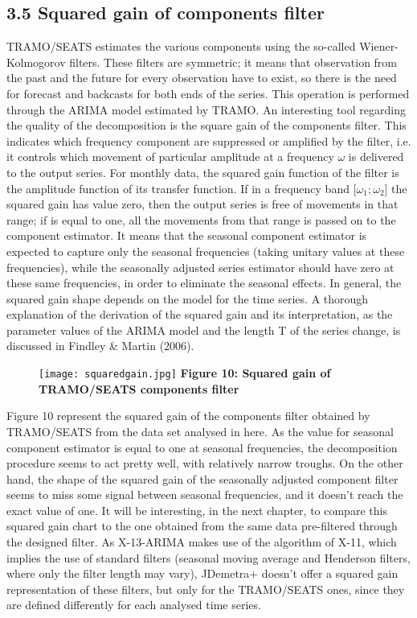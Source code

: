 \documentclass{article}
\begin{document}
\subsection*{\small 3.5 Squared gain of components filter}
TRAMO/SEATS estimates the various components using the so-called Wiener-Kolmogorov filters. These filters are symmetric; it means that observation from the past and the future for every observation have to exist, so there is the need for forecast and backcasts for both ends of the series. This operation is performed through the ARIMA model estimated by TRAMO.  An interesting tool regarding the quality of the decomposition is the square gain of the components filter. This indicates which frequency component are suppressed or amplified by the filter, i.e. it controls which movement of particular amplitude at a frequency $\omega$ is delivered to the output series. For monthly data, the squared gain function of the filter is the amplitude function of its transfer function. If in a frequency band [$\omega_{1};\omega_{2}$] the squared gain has value zero, then the output series is free of movements in that range; if is equal to one, all the movements from that range is passed on to the component estimator. It means that the seasonal component estimator is expected to capture only the seasonal frequencies (taking unitary values at these frequencies), while the seasonally adjusted series estimator should have zero at these same frequencies, in order to eliminate the seasonal effects. In general, the squared gain shape depends on the model for the time series. A thorough explanation of the derivation of the squared gain and its interpretation, as the parameter values of the ARIMA model and the length T of the series change, is discussed in Findley \& Martin (2006).
\begin{figure}[H]
\centering
  \texttt{[image: squaredgain.jpg]}
  {\textbf{\scriptsize Figure 10: Squared gain of TRAMO/SEATS components filter}}
\end{figure}
Figure 10 represent the squared gain of the components filter obtained by TRAMO/SEATS from the data set analysed in here. As the value for seasonal component estimator is equal to one at seasonal frequencies, the decomposition procedure seems to act pretty well, with relatively narrow troughs. On the other hand, the shape of the squared gain of the seasonally adjusted component filter seems to miss some signal between seasonal frequencies, and it doesn't reach the exact value of one. It will be interesting, in the next chapter, to compare this squared gain chart to the one obtained from the same data pre-filtered through the designed filter.
As X-13-ARIMA makes use of the algorithm of X-11, which implies the use of standard filters (seasonal moving average and Henderson filters, where only the filter length may vary), JDemetra+ doesn't offer a squared gain representation of these filters, but only for the TRAMO/SEATS ones, since they are defined differently for each analysed time series.
\end{document}
